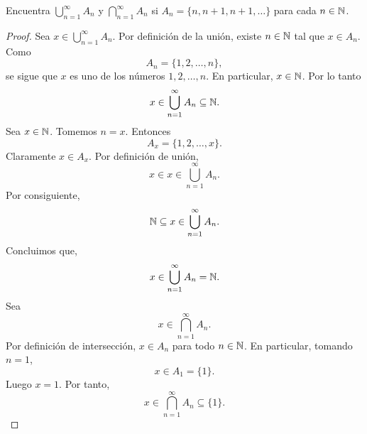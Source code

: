 \documentclass[12pt,a4paper]{article}
\begin{document}
        
    
    \thispagestyle{empty}
    

    \begin{problema}
        Encuentra $\bigcup_{n=1}^{\infty}A_{n}$ y $\bigcap_{n=1}^{\infty}A_{n}$ si $A_{n}=\{n,n+1,n+1,\dots\}$ para cada $n\in\mathbb{N}$.
    \end{problema}

    \begin{proof}
        Sea $x\in\bigcup_{n=1}^{\infty}A_{n}$. Por definición de la unión, existe $n\in\mathbb{N}$ tal que $x\in A_{n}$. Como
        \begin{equation*}
            A_{n}=\{1,2,\dots,n\},
        \end{equation*}
        se sigue que $x$ es uno de los números $1,2,\dots,n$. En particular, $x\in\mathbb{N}$. Por lo tanto
        \begin{equation*}
            x\in\bigcup_{n=1}^{\infty}A_{n}\subseteq\mathbb{N}.
        \end{equation*}
        Sea $x\in\mathbb{N}$. Tomemos $n=x$. Entonces
        \begin{equation*}
            A_{x}=\{1,2,\dots,x\}.
        \end{equation*}
        Claramente $x\in A_{x}$. Por definición de unión,
        \begin{equation*}
            x\in x\in\bigcup_{n=1}^{\infty}A_{n}.
        \end{equation*}
        Por consiguiente,
        \begin{equation*}
            \mathbb{N}\subseteq x\in\bigcup_{n=1}^{\infty}A_{n}.
        \end{equation*}
        Concluimos que,
        \begin{equation*}
            x\in\bigcup_{n=1}^{\infty}A_{n}=\mathbb{N}.
        \end{equation*}
        Sea
        \begin{equation*}
            x\in\bigcap_{n=1}^{\infty}A_{n}.
        \end{equation*}
        Por definición de intersección, $x\in A_{n}$ para todo $n\in\mathbb{N}$. En particular, tomando $n=1$,
        \begin{equation*}
            x\in A_{1}=\{1\}.
        \end{equation*}
        Luego $x=1$. Por tanto,
        \begin{equation*}
            x\in\bigcap_{n=1}^{\infty}A_{n}\subseteq\{1\}.
        \end{equation*}

\end{proof}
\end{document}
